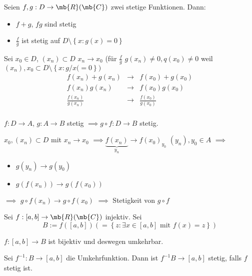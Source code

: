 \begin{Sat}
  Seien $f,g:D\to\mb{R}(\mb{C})$ zwei stetige Funktionen. Dann:
  \begin{itemize}
    \item $f+g$, $fg$ sind stetig
    \item $\frac{f}{g}$ ist stetig auf $D\setminus\left\{ x:g(x)=0 \right\}$
  \end{itemize}
\end{Sat}
\begin{Bew}
  Sei $x_0\in D$, $(x_n)\subset D$ $x_n\to x_0$ (für $\frac{f}{g}$ $g(x_n)\neq 0, q(x_0)\neq 0$ weil $(x_n), {x_0}\subset D\setminus\left\{ x:g/x(=0 \right\})$
  \begin{align*}
    f(x_n)+g(x_n)&\to& f(x_0)+g(x_0)\\
    f(x_n)g(x_n)&\to& f(x_0)g(x_0)\\
    \frac{f(x_n)}{g(x_n)}&\to& \frac{f(x_0)}{g(x_0)}\\
  \end{align*}
\end{Bew}
\begin{Sat}
  $f:D\to A$, $g:A\to B$ stetig $\implies g\circ f:D\to B$ stetig.
\end{Sat}
\begin{Bew}
  $x_0, (x_n)\subset D$ mit $x_n\to x_0$ $\implies \underbrace{f(x_n)}_{y_n}\to f(x_0)_{y_0}$ $(y_n), y_0\in A$ $\implies$ 
  \begin{itemize}
    \item $g(y_n)\to g(y_0)$
    \item $g(f(x_n))\to g(f(x_0))$
  \end{itemize}
  $\implies$ $g\circ f(x_n)\to g\circ f(x_0)$ $\implies$ Stetigkeit von $g\circ f$
\end{Bew}
\begin{Sat}
  Sei $f:\left[ a,b \right]\to\mb{R}(\mb{C})$ injektiv. Sei
  \[B:=f\left( \left[ a,b \right] \right)\left( =\left\{ z:\exists x\in\left[ a,b \right]\text{ mit } f(x)=z \right\} \right)\]
  \begin{Bem}
    $f:\left[ a,b \right]\to B$ ist bijektiv und deswegen umkehrbar.
  \end{Bem}
  Sei $f^{-1}:B\to\left[ a,b \right]$ die Umkehrfunktion. Dann ist $f^{-1}B\to \left[ a,b \right]$ stetig, falls $f$ stetig ist.
\end{Sat}
